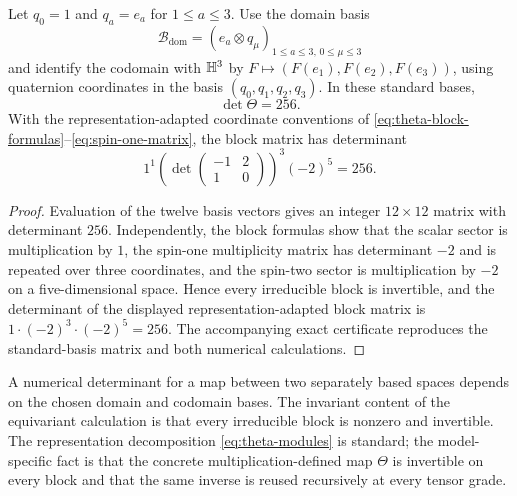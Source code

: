 \begin{proposition}\label{prop:det-theta}
Let $q_0=1$ and $q_a=e_a$ for $1\le a\le3$.  Use the domain basis
\[
  \mathcal B_{\mathrm{dom}}=(e_a\otimes q_\mu)_{1\le a\le3,\,0\le\mu\le3}
\]
and identify the codomain with $\mathbb H^3$ by
$F\mapsto(F(e_1),F(e_2),F(e_3))$, using quaternion coordinates in the basis
$(q_0,q_1,q_2,q_3)$.  In these standard bases,
\[
  \det\Theta=256.
\]
With the representation-adapted coordinate conventions of
\eqref{eq:theta-block-formulas}--\eqref{eq:spin-one-matrix}, the block matrix has determinant
\[
  1^1\left(\det\begin{pmatrix}-1&2\\1&0\end{pmatrix}\right)^3(-2)^5=256.
\]
\end{proposition}

\begin{proof}
Evaluation of the twelve basis vectors gives an integer $12\times12$ matrix with determinant $256$.  Independently, the block formulas show that the scalar sector is multiplication by $1$, the spin-one multiplicity matrix has determinant $-2$ and is repeated over three coordinates, and the spin-two sector is multiplication by $-2$ on a five-dimensional space.  Hence every irreducible block is invertible, and the determinant of the displayed representation-adapted block matrix is $1\cdot(-2)^3\cdot(-2)^5=256$.  The accompanying exact certificate reproduces the standard-basis matrix and both numerical calculations.
\end{proof}

\begin{remark}
A numerical determinant for a map between two separately based spaces depends on the chosen domain and codomain bases.  The invariant content of the equivariant calculation is that every irreducible block is nonzero and invertible.  The representation decomposition \eqref{eq:theta-modules} is standard; the model-specific fact is that the concrete multiplication-defined map $\Theta$ is invertible on every block and that the same inverse is reused recursively at every tensor grade.
\end{remark}
